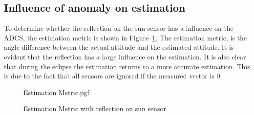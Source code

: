 %
%
%	
%	

\subsection{Influence of anomaly on estimation}
To determine whether the reflection on the sun sensor has a influence on the ADCS, the estimation metric is shown in Figure~\ref{fig:reflectionEstimation}. The estimation metric, is the angle difference between the actual attitude and the estimated attitude. It is evident that the reflection has a large influence on the estimation. It is also clear that during the eclipse the estimation returns to a more accurate estimation. This is due to the fact that all sensors are ignored if the measured vector is $0$.
\begin{figure}[!htb]
	\centering
	
	{Estimation Metric.pgf}
	
	\caption{Estimation Metric with reflection on sun sensor}
	\label{fig:reflectionEstimation}
\end{figure}

